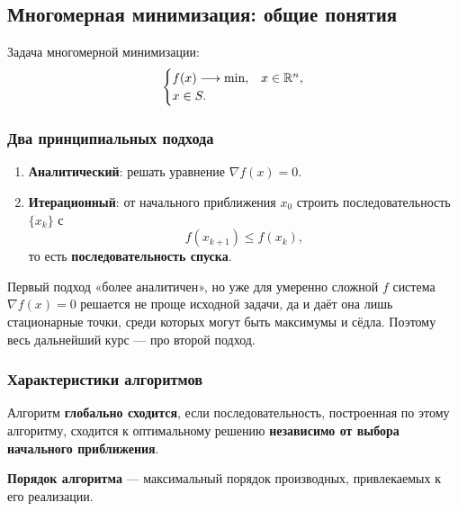 
\subsection{Многомерная минимизация: общие понятия}
\label{subsec:multidim-basics}

Задача многомерной минимизации:
\[
  \begin{cases}
    f(x) \longrightarrow \min, & x \in \mathbb{R}^n, \\
    x \in S .
  \end{cases}
\]

\subsubsection*{Два принципиальных подхода}

\begin{enumerate}[label=\arabic*., leftmargin=2em]
  \item \textbf{Аналитический}: решать уравнение $\nabla f(x) = 0$.
  \item \textbf{Итерационный}: от начального приближения $x_0$ строить
        последовательность $\{x_k\}$ с
        \[
          f(x_{k+1}) \le f(x_k) ,
        \]
        то есть \textbf{последовательность спуска}.
\end{enumerate}

\begin{idea}
Первый подход «более аналитичен», но уже для умеренно сложной $f$ система
$\nabla f(x) = 0$ решается не проще исходной задачи, да и даёт она лишь
стационарные точки, среди которых могут быть максимумы и сёдла. Поэтому весь
дальнейший курс — про второй подход.
\end{idea}

\subsubsection*{Характеристики алгоритмов}

\begin{definition}
Алгоритм \textbf{глобально сходится}, если последовательность, построенная по
этому алгоритму, сходится к оптимальному решению \textbf{независимо от выбора
начального приближения}.
\end{definition}

\begin{definition}
\textbf{Порядок алгоритма} — максимальный порядок производных, привлекаемых к
его реализации.
\end{definition}

